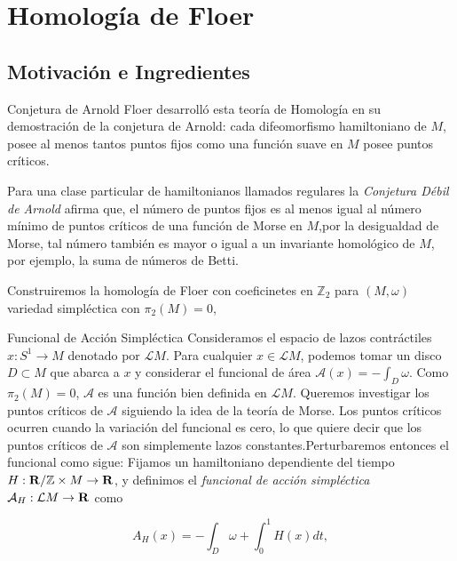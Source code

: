 \documentclass{beamer}
\def\Z{{\mathbb Z}}
\def\R\re
\def \R{{\bf R}}
\def \re{{\mathbb R}}
\begin{document}
\section{Homología de Floer}
\subsection{Motivación e Ingredientes}

\begin{frame}{Conjetura de Arnold}
Floer desarrolló esta teoría de Homología en su demostración de la conjetura de Arnold: \pause cada difeomorfismo hamiltoniano de \(M\), posee al menos tantos puntos fijos como una función suave en \(M\) posee puntos críticos.\pause

Para una clase particular de hamiltonianos llamados regulares la \textit{Conjetura Débil de Arnold} afirma que, el número de puntos fijos es al menos igual al número mínimo de puntos críticos de una función de Morse en \(M\),\pause por la desigualdad de Morse, tal número también es mayor o igual a un invariante homológico de \(M\), por ejemplo, la suma de números de Betti.\pause

Construiremos la homología de Floer con coeficinetes en $\Z_2$ para $(M, \omega)$ variedad simpléctica con $\pi_2(M)=0$,




\end{frame}

\begin{frame}{Funcional de Acción Simpléctica}
Consideramos el espacio de lazos contráctiles $x: S^1 \to M$ denotado por $\mathcal LM$. \pause Para cualquier $x \in \mathcal LM$, podemos tomar un disco $D \subset M$ que abarca a $x$ y considerar el funcional de área $\mathcal A(x) = - \int_D \omega$. \pause  Como $\pi_2(M) = 0$, $\mathcal A$ es una función bien definida en $\mathcal LM$. \pause Queremos investigar los puntos críticos de $\mathcal A$ siguiendo la idea de la teoría de Morse. Los puntos críticos ocurren cuando la variación del funcional es cero, lo que quiere decir  que los puntos críticos de $\mathcal A$ son simplemente lazos constantes.\pause Perturbaremos entonces el funcional como sigue: Fijamos un hamiltoniano dependiente del tiempo $H: \R/\Z \times M \to \R$, y definimos el {\it funcional de acción simpléctica} $\mathcal A_H: \mathcal LM \to \R$ como

\[A_H (x) = - \int_D \omega + \int_0^1 H(x)dt,\]


\end{frame}
\end{document}
